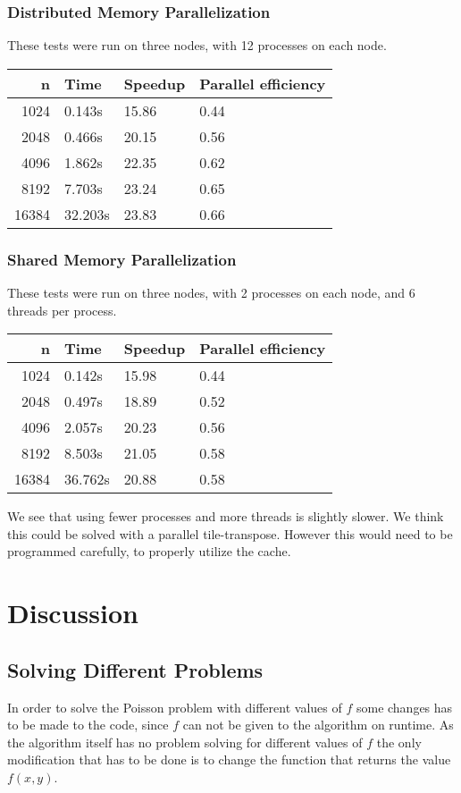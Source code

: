 \documentclass[a4paper, 12pt]{article}
\begin{document}
        \subsubsection{Distributed Memory Parallelization}
        These tests were run on three nodes, with 12 processes on each node.

        \begin{tabular}{|r|l|l|l|}
        \hline
        n & Time & Speedup & Parallel efficiency\\
        \hline
        1024 & 0.143s & 15.86 & 0.44 \\
        \hline
        2048 & 0.466s & 20.15 & 0.56 \\
        \hline
        4096 & 1.862s & 22.35 & 0.62\\
        \hline
        8192 & 7.703s & 23.24 & 0.65\\
        \hline
        16384 & 32.203s & 23.83 & 0.66 \\
        \hline
        \end{tabular}
         
        \subsubsection{Shared Memory Parallelization}
        These tests were run on three nodes, with 2 processes on each node, and 6 threads per process.

        \begin{tabular}{|r|l|l|l|}
        \hline
        n & Time & Speedup & Parallel efficiency \\
        \hline
        1024 & 0.142s & 15.98 & 0.44 \\
        \hline
        2048 & 0.497s & 18.89 & 0.52 \\
        \hline
        4096 & 2.057s & 20.23 & 0.56 \\
        \hline
        8192 & 8.503s & 21.05 & 0.58\\
        \hline
        16384 & 36.762s & 20.88 & 0.58\\
        \hline
        \end{tabular}
        
        We see that using fewer processes and more threads is slightly slower. We think this could be solved with a parallel tile-transpose. However this would need to be programmed carefully, to properly utilize the cache.

\section{Discussion}
	\subsection{Solving Different Problems}
	In order to solve the Poisson problem with different values of $f$ some changes has to be made to the code, since $f$ can not be given to the algorithm on runtime. As the algorithm itself has no problem solving for different values of $f$ the only modification that has to be done is to change the function that returns the value $f(x, y)$.

    
\end{document}
